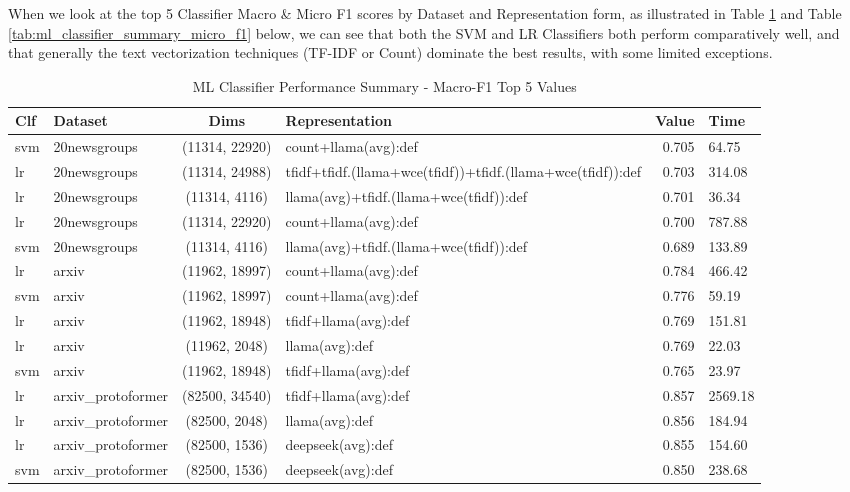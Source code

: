 \documentclass[final]{clv2025-revised}
\begin{document}
When we look at the top 5 Classifier Macro \& Micro F1 scores by Dataset and Representation form, as illustrated in Table \ref{tab:ml_classifier_summary_macro_f1} and Table \ref{tab:ml_classifier_summary_micro_f1} below, we can see that both the SVM and LR Classifiers both perform comparatively well, and that generally the text vectorization techniques (TF-IDF or Count) dominate the best results, with some limited exceptions. 

\begin{table}[h!]
\centering
\scriptsize
\caption{ML Classifier Performance Summary - Macro-F1 Top 5 Values}
\label{tab:ml_classifier_summary_macro_f1}
\begin{tabular}{@{}p{.7cm} p{1.8cm} c >{\raggedright\arraybackslash}p{6.1cm} r p{1.0cm}@{}}
\toprule
\textbf{Clf} & \textbf{Dataset} & \textbf{Dims} & \textbf{Representation} & \textbf{Value} & \textbf{Time} \\
\midrule
svm & 20newsgroups & (11314, 22920) & count+llama(avg):def & 0.705 & 64.75 \\
lr & 20newsgroups & (11314, 24988) & tfidf+tfidf.(llama+wce(tfidf))+tfidf.(llama+wce(tfidf)):def & 0.703 & 314.08 \\
lr & 20newsgroups & (11314, 4116) & llama(avg)+tfidf.(llama+wce(tfidf)):def & 0.701 & 36.34 \\
lr & 20newsgroups & (11314, 22920) & count+llama(avg):def & 0.700 & 787.88 \\
svm & 20newsgroups & (11314, 4116) & llama(avg)+tfidf.(llama+wce(tfidf)):def & 0.689 & 133.89 \\
\midrule
lr & arxiv & (11962, 18997) & count+llama(avg):def & 0.784 & 466.42 \\
svm & arxiv & (11962, 18997) & count+llama(avg):def & 0.776 & 59.19 \\
lr & arxiv & (11962, 18948) & tfidf+llama(avg):def & 0.769 & 151.81 \\
lr & arxiv & (11962, 2048) & llama(avg):def & 0.769 & 22.03 \\
svm & arxiv & (11962, 18948) & tfidf+llama(avg):def & 0.765 & 23.97 \\
\midrule
lr & arxiv\_protoformer & (82500, 34540) & tfidf+llama(avg):def & 0.857 & 2569.18 \\
lr & arxiv\_protoformer & (82500, 2048) & llama(avg):def & 0.856 & 184.94 \\
lr & arxiv\_protoformer & (82500, 1536) & deepseek(avg):def & 0.855 & 154.60 \\
svm & arxiv\_protoformer & (82500, 1536) & deepseek(avg):def & 0.850 & 238.68 \\

\end{tabular}
\end{table}
\end{document}
